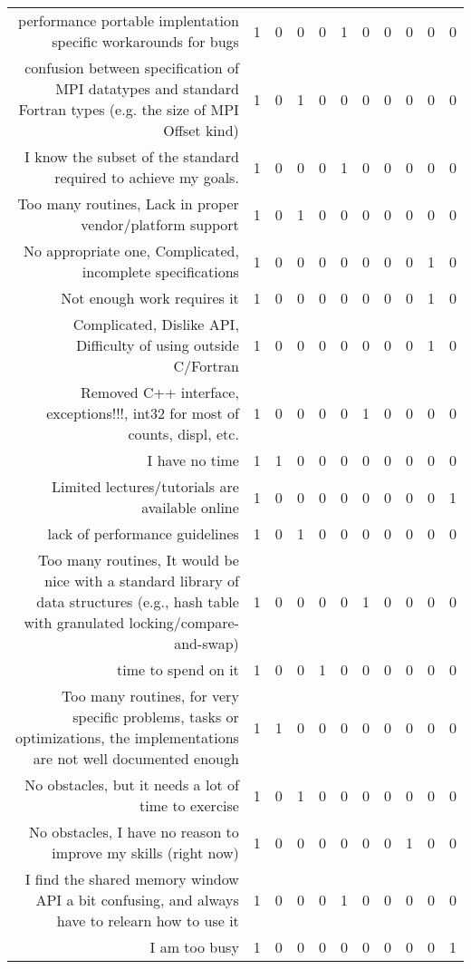 {\begin{landscape}
\begin{longtable}[htb]{r|c|c|c|c|c|c|c|c|c|c}
{performance portable  implentation specific workarounds for bugs} & 1 & 0 & 0 & 0 & 1 & 0 & 0 & 0 & 0 & 0 \\%
{confusion between specification of MPI datatypes and standard Fortran types (e.g. the size of MPI Offset kind)} & 1 & 0 & 1 & 0 & 0 & 0 & 0 & 0 & 0 & 0 \\%
{I know the subset of the standard required to achieve my goals.} & 1 & 0 & 0 & 0 & 1 & 0 & 0 & 0 & 0 & 0 \\%
{Too many routines, Lack in proper vendor/platform support} & 1 & 0 & 1 & 0 & 0 & 0 & 0 & 0 & 0 & 0 \\%
{No appropriate one, Complicated, incomplete specifications} & 1 & 0 & 0 & 0 & 0 & 0 & 0 & 0 & 1 & 0 \\%
{Not enough work requires it} & 1 & 0 & 0 & 0 & 0 & 0 & 0 & 0 & 1 & 0 \\%
{Complicated, Dislike API, Difficulty of using outside C/Fortran} & 1 & 0 & 0 & 0 & 0 & 0 & 0 & 0 & 1 & 0 \\%
{Removed C++ interface, exceptions!!!, int32 for most of counts, displ, etc.} & 1 & 0 & 0 & 0 & 0 & 1 & 0 & 0 & 0 & 0 \\%
{I have no time} & 1 & 1 & 0 & 0 & 0 & 0 & 0 & 0 & 0 & 0 \\%
{Limited lectures/tutorials are available online} & 1 & 0 & 0 & 0 & 0 & 0 & 0 & 0 & 0 & 1 \\%
{lack of performance guidelines} & 1 & 0 & 1 & 0 & 0 & 0 & 0 & 0 & 0 & 0 \\%
{Too many routines, It would be nice with a standard library of data structures (e.g., hash table with granulated locking/compare-and-swap)} & 1 & 0 & 0 & 0 & 0 & 1 & 0 & 0 & 0 & 0 \\%
{time to spend on it} & 1 & 0 & 0 & 1 & 0 & 0 & 0 & 0 & 0 & 0 \\%
{Too many routines, for very specific problems, tasks or optimizations, the implementations are not well documented enough} & 1 & 1 & 0 & 0 & 0 & 0 & 0 & 0 & 0 & 0 \\%
{No obstacles, but it needs a lot of time to exercise} & 1 & 0 & 1 & 0 & 0 & 0 & 0 & 0 & 0 & 0 \\%
{No obstacles, I have no reason to improve my skills (right now)} & 1 & 0 & 0 & 0 & 0 & 0 & 0 & 1 & 0 & 0 \\%
{I find the shared memory window API a bit confusing, and always have to relearn how to use it} & 1 & 0 & 0 & 0 & 1 & 0 & 0 & 0 & 0 & 0 \\%
{I am too busy} & 1 & 0 & 0 & 0 & 0 & 0 & 0 & 0 & 0 & 1 \\%

\end{longtable}
\end{landscape}}
